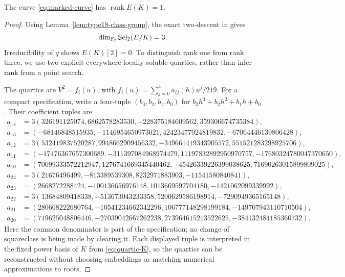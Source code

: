 \begin{proposition}\label{prop:marked-rank}
The curve \eqref{eq:marked-curve} has $\operatorname{rank}E(K)=1$.
\end{proposition}
\begin{proof}
Using Lemma~\ref{lem:type18-class-group}, the exact two-descent in
 gives
\[
 \dim_{\mathbb F_2}\operatorname{Sel}_2(E/K)=3.
\]
Irreducibility of $q$ shows $E(K)[2]=0$. To distinguish rank one
from rank three, we use two explicit everywhere locally soluble
quartics, rather than infer rank from a point search.

The quartics are $V^2=f_i(u)$, with
$f_i(u)=\sum_{j=0}^4 a_{ij}(h)u^j/219$. For a compact specification,
write a four-tuple $(b_3,b_2,b_1,b_0)$ for
$b_3h^3+b_2h^2+b_1h+b_0$. Their coefficient tuples are
\begingroup\small
\begin{align*}
 a_{14}&=3(326191125074,6862578283530,-228375184609562,359306674735384),\\
 a_{13}&=(-68146848515935,-1146954650973021,42423477924819832,-67064446139806428),\\
 a_{12}&=3(532419837520287,9948662909456332,-349661419343905572,551521283298925706),\\
 a_{11}&=(-17476367657300689,-311397084968974479,11197832892950970757,-17680324780047370650),\\
 a_{10}&=(70099333572212947,1276741669345440462,-45426339226399038625,71690263015899809025),\\[2pt]
 a_{24}&=3(21676496499,-813389539308,8232971883903,-11541580840841),\\
 a_{23}&=(2668272288424,-100136656976148,1013669592704180,-1421062099339992),\\
 a_{22}&=3(13684809418338,-513673043233358,5200629586198914,-7290949365165148),\\
 a_{21}&=(280668222680764,-10541234662342296,106777148298199184,-149707943110710504),\\
 a_{20}&=(719625048806446,-27039042667262238,273964615213522625,-384132484185360732).
\end{align*}
\endgroup
Here the common denominator is part of the specification; no change
of squareclass is being made by clearing it. Each displayed tuple is
interpreted in the fixed power basis of $K$ from
\eqref{eq:quartic-K}, so the quartics can be reconstructed without
choosing embeddings or matching numerical approximations to roots.


\end{proof}
